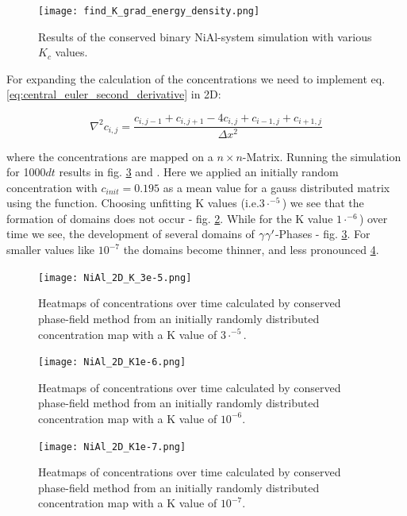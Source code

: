 \begin{figure}[htb]
	\texttt{[image: find\_K\_grad\_energy\_density.png]} 
	\caption{Results of the conserved binary NiAl-system simulation with various \(K_{c}\) values.}
	\label{fig:vary_K}
\end{figure}

For expanding the calculation of the concentrations we need to implement eq. \ref{eq:central_euler_second_derivative} in 2D:

\begin{equation}
	\nabla^{2} c_{i,j} = \frac{c_{i,j-1} + c_{i,j+1} - 4c_{i, j} + c_{i-1, j} + c_{i+1, j}}{\Delta x^{2}} 
\end{equation}

where the concentrations are mapped on a \(n \times n\)-Matrix. Running the simulation for 1000\(dt\) results in fig. \ref{fig:NiAl_2D_heatmaps} and . Here we applied an initially random concentration with \(c_{init} = 0.195\) as a mean value for a gauss distributed matrix using the  function. Choosing unfitting K values (i.e.\(3 \cdot ^{-5}\)) we see that the formation of domains does not occur - fig. 
 \ref{fig:NiAl_2D_heatmaps_K3e-5}. While for the K value \(1 \cdot ^{-6}\))   over time we see, the development of several domains of \(\gamma \\ \gamma '\)-Phases - fig. \ref{fig:NiAl_2D_heatmaps}. For smaller values like \(10^{-7}\) the domains become thinner, and less pronounced \ref{fig:NiAl_2D_heatmaps_K1e-7}.

\begin{figure}[htb]
	\texttt{[image: NiAl\_2D\_K\_3e-5.png]} 
	\caption{Heatmaps of concentrations over time calculated by conserved phase-field method from an initially randomly distributed concentration map with a K value of \(3 \cdot ^{-5}\).}
	\label{fig:NiAl_2D_heatmaps_K3e-5}
\end{figure}

\begin{figure}[htb]
	\texttt{[image: NiAl\_2D\_K1e-6.png]} 
	\caption{Heatmaps of concentrations over time calculated by conserved phase-field method from an initially randomly distributed concentration map with a K value of \(10^{-6}\).}
	\label{fig:NiAl_2D_heatmaps}
\end{figure}

\begin{figure}[htb]
	\texttt{[image: NiAl\_2D\_K1e-7.png]} 
	\caption{Heatmaps of concentrations over time calculated by conserved phase-field method from an initially randomly distributed concentration map with a K value of \(10^{-7}\).}
	\label{fig:NiAl_2D_heatmaps_K1e-7}
\end{figure}


\printbibliography




